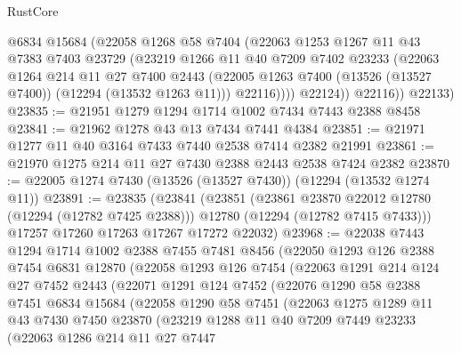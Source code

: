 \begin{lexlean}{RustCore}
\begin{coremodule}
              @6834
              @15684
              (@22058
                @1268
                @58
                @7404
                (@22063
                  @1253
                  @1267
                  @11
                  @43
                  @7383
                  @7403
                  @23729
                  (@23219
                    @1266
                    @11
                    @40
                    @7209
                    @7402
                    @23233
                    (@22063
                      @1264
                      @214
                      @11
                      @27
                      @7400
                      @2443
                      (@22005 @1263 @7400 (@13526 (@13527 @7400)) (@12294 (@13532 @1263 @11)))
                      @22116))))
              @22124))
          @22116))
      @22133)
@23835 := @21951 @1279 @1294 @1714 @1002 @7434 @7443 @2388 @8458
@23841 := @21962 @1278 @43 @13 @7434 @7441 @4384
@23851 := @21971 @1277 @11 @40 @3164 @7433 @7440 @2538 @7414 @2382 @21991
@23861 := @21970 @1275 @214 @11 @27 @7430 @2388 @2443 @2538 @7424 @2382
@23870 := @22005 @1274 @7430 (@13526 (@13527 @7430)) (@12294 (@13532 @1274 @11))
@23891 := @23835
    (@23841
      (@23851
        (@23861 @23870 @22012 @12780 (@12294 (@12782 @7425 @2388)))
        @12780
        (@12294 (@12782 @7415 @7433)))
      @17257
      @17260
      @17263
      @17267
      @17272
      @22032)
@23968 := @22038
    @7443
    @1294
    @1714
    @1002
    @2388
    @7455
    @7481
    @8456
    (@22050
      @1293
      @126
      @2388
      @7454
      @6831
      @12870
      (@22058
        @1293
        @126
        @7454
        (@22063
          @1291
          @214
          @124
          @27
          @7452
          @2443
          (@22071
            @1291
            @124
            @7452
            (@22076
              @1290
              @58
              @2388
              @7451
              @6834
              @15684
              (@22058
                @1290
                @58
                @7451
                (@22063
                  @1275
                  @1289
                  @11
                  @43
                  @7430
                  @7450
                  @23870
                  (@23219
                    @1288
                    @11
                    @40
                    @7209
                    @7449
                    @23233
                    (@22063
                      @1286
                      @214
                      @11
                      @27
                      @7447

\end{coremodule}
\end{lexlean}
